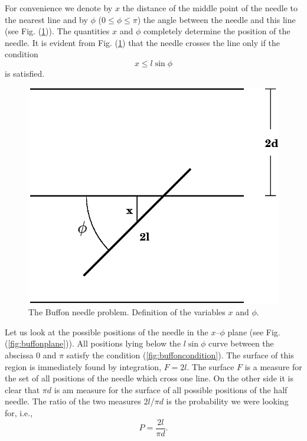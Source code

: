 For convenience we denote by $x$ the distance of the middle point of
the needle to the nearest line and by $\phi$ ($0 \le \phi \le \pi$) the
angle between the needle and this line (see
Fig. (\ref{fig:buffondefinition})). The quantities $x$ and $\phi$
completely determine the position of the needle. It is evident from
Fig. (\ref{fig:buffondefinition}) that the needle crosses the line only if
the condition
\begin{equation}
\label{fig:buffoncondition}
x \le l \sin \phi
\end{equation}
is satisfied.

\begin{figure}
\label{fig:buffondefinition}
\includegraphics[width=.7\textwidth]{Figures/buffondefinition.eps}
\caption{The Buffon needle problem. Definition of the variables $x$
  and $\phi$.}
\end{figure}

Let us look at the possible positions of the needle in the $x$--$\phi$
plane (see Fig. (\ref{fig:buffonplane})). All positions lying below the
$l\sin \phi$ curve between the abscissa 0 and $\pi$ satisfy the
condition (\ref{fig:buffoncondition}). The surface of this region is
immediately found by integration, $F=2l$. The surface $F$ is a measure
for the set of all positions of the needle which cross one line. On
the other side it is clear that $\pi d$ is am measure for the surface
of all possible positions of the half needle. The ratio of the two
measures $ 2l/\pi d$ is the probability we were looking for, i.e.,
\begin{equation}
\label{buffonprobability}
P = \frac{2 l}{\pi d}.
\end{equation}

